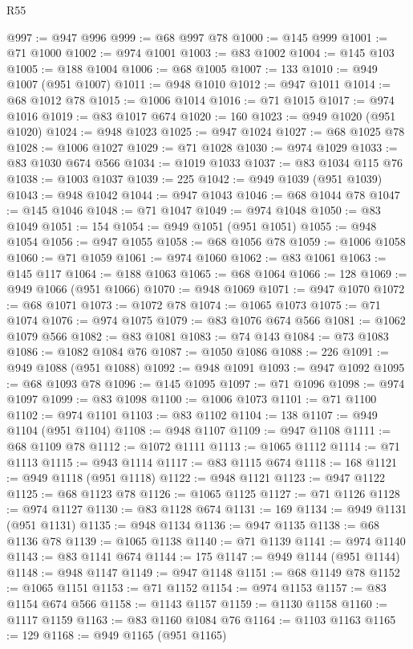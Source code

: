 \begin{lexlean}{R55}
\begin{coremodule}
{{@997 := @947 @996
@999 := @68 @997 @78
@1000 := @145 @999
@1001 := @71 @1000
@1002 := @974 @1001
@1003 := @83 @1002
@1004 := @145 @103
@1005 := @188 @1004
@1006 := @68 @1005
@1007 := 133
@1010 := @949 @1007 (@951 @1007)
@1011 := @948 @1010
@1012 := @947 @1011
@1014 := @68 @1012 @78
@1015 := @1006 @1014
@1016 := @71 @1015
@1017 := @974 @1016
@1019 := @83 @1017 @674
@1020 := 160
@1023 := @949 @1020 (@951 @1020)
@1024 := @948 @1023
@1025 := @947 @1024
@1027 := @68 @1025 @78
@1028 := @1006 @1027
@1029 := @71 @1028
@1030 := @974 @1029
@1033 := @83 @1030 @674 @566
@1034 := @1019 @1033
@1037 := @83 @1034 @115 @76
@1038 := @1003 @1037
@1039 := 225
@1042 := @949 @1039 (@951 @1039)
@1043 := @948 @1042
@1044 := @947 @1043
@1046 := @68 @1044 @78
@1047 := @145 @1046
@1048 := @71 @1047
@1049 := @974 @1048
@1050 := @83 @1049
@1051 := 154
@1054 := @949 @1051 (@951 @1051)
@1055 := @948 @1054
@1056 := @947 @1055
@1058 := @68 @1056 @78
@1059 := @1006 @1058
@1060 := @71 @1059
@1061 := @974 @1060
@1062 := @83 @1061
@1063 := @145 @117
@1064 := @188 @1063
@1065 := @68 @1064
@1066 := 128
@1069 := @949 @1066 (@951 @1066)
@1070 := @948 @1069
@1071 := @947 @1070
@1072 := @68 @1071
@1073 := @1072 @78
@1074 := @1065 @1073
@1075 := @71 @1074
@1076 := @974 @1075
@1079 := @83 @1076 @674 @566
@1081 := @1062 @1079 @566
@1082 := @83 @1081
@1083 := @74 @143
@1084 := @73 @1083
@1086 := @1082 @1084 @76
@1087 := @1050 @1086
@1088 := 226
@1091 := @949 @1088 (@951 @1088)
@1092 := @948 @1091
@1093 := @947 @1092
@1095 := @68 @1093 @78
@1096 := @145 @1095
@1097 := @71 @1096
@1098 := @974 @1097
@1099 := @83 @1098
@1100 := @1006 @1073
@1101 := @71 @1100
@1102 := @974 @1101
@1103 := @83 @1102
@1104 := 138
@1107 := @949 @1104 (@951 @1104)
@1108 := @948 @1107
@1109 := @947 @1108
@1111 := @68 @1109 @78
@1112 := @1072 @1111
@1113 := @1065 @1112
@1114 := @71 @1113
@1115 := @943 @1114
@1117 := @83 @1115 @674
@1118 := 168
@1121 := @949 @1118 (@951 @1118)
@1122 := @948 @1121
@1123 := @947 @1122
@1125 := @68 @1123 @78
@1126 := @1065 @1125
@1127 := @71 @1126
@1128 := @974 @1127
@1130 := @83 @1128 @674
@1131 := 169
@1134 := @949 @1131 (@951 @1131)
@1135 := @948 @1134
@1136 := @947 @1135
@1138 := @68 @1136 @78
@1139 := @1065 @1138
@1140 := @71 @1139
@1141 := @974 @1140
@1143 := @83 @1141 @674
@1144 := 175
@1147 := @949 @1144 (@951 @1144)
@1148 := @948 @1147
@1149 := @947 @1148
@1151 := @68 @1149 @78
@1152 := @1065 @1151
@1153 := @71 @1152
@1154 := @974 @1153
@1157 := @83 @1154 @674 @566
@1158 := @1143 @1157
@1159 := @1130 @1158
@1160 := @1117 @1159
@1163 := @83 @1160 @1084 @76
@1164 := @1103 @1163
@1165 := 129
@1168 := @949 @1165 (@951 @1165)
}}
\end{coremodule}
\end{lexlean}
